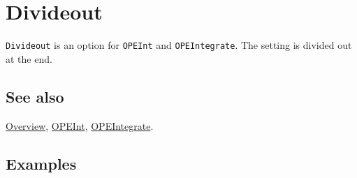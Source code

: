 \documentclass[../FeynCalcManual.tex]{subfiles}
\begin{document}
\hypertarget{divideout}{%
\section{Divideout}\label{divideout}}

\texttt{Divideout} is an option for \texttt{OPEInt} and
\texttt{OPEIntegrate}. The setting is divided out at the end.

\subsection{See also}

\hyperlink{toc}{Overview}, \hyperlink{opeint}{OPEInt},
\hyperlink{opeintegrate}{OPEIntegrate}.

\subsection{Examples}
\end{document}
